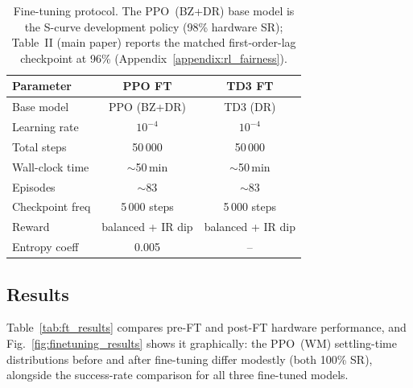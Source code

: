 \begin{table}[!t]
\centering
\renewcommand{\arraystretch}{1.15}
\caption{Fine-tuning protocol. The PPO~(BZ+DR) base model is the S-curve
  development policy (98\% hardware SR); Table~II (main paper) reports the
  matched first-order-lag checkpoint at 96\% (Appendix~\ref{appendix:rl_fairness}).}
\label{tab:ft_protocol}
\begin{tabular}{lcc}
\toprule
\textbf{Parameter} & \textbf{PPO FT} & \textbf{TD3 FT} \\
\midrule
Base model           & PPO (BZ+DR)           & TD3 (DR)              \\
Learning rate        & $10^{-4}$             & $10^{-4}$             \\
Total steps          & 50\,000               & 50\,000               \\
Wall-clock time      & $\sim$50\,min         & $\sim$50\,min         \\
Episodes             & $\sim$83              & $\sim$83              \\
Checkpoint freq      & 5\,000 steps          & 5\,000 steps          \\
Reward               & balanced + IR dip     & balanced + IR dip     \\
Entropy coeff        & 0.005                 & --                   \\
\bottomrule
\end{tabular}
\end{table}

\subsection{Results}

Table~\ref{tab:ft_results} compares pre-FT and post-FT hardware
performance, and Fig.~\ref{fig:finetuning_results} shows it graphically: the
PPO~(WM) settling-time distributions before and after fine-tuning differ
modestly (both 100\% SR), alongside the success-rate comparison
for all three fine-tuned models.

